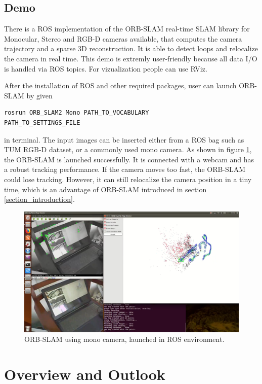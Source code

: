 \documentclass[letterpaper, 10 pt, conference]{ieeeconf}  %
\begin{document}
\subsection{Demo}
There is a ROS implementation of the ORB-SLAM real-time SLAM library for Monocular, Stereo and RGB-D cameras available, that computes the camera trajectory and a sparse 3D reconstruction. It is able to detect loops and relocalize the camera in real time. This demo is extremly user-friendly because all data I/O is handled via ROS topics. For vizualization people can use RViz. 

After the installation of ROS and other required packages, user can launch ORB-SLAM by given
%
\begin{lstlisting}
rosrun ORB_SLAM2 Mono PATH_TO_VOCABULARY 
PATH_TO_SETTINGS_FILE
\end{lstlisting}
%
in terminal. The input images can be inserted either from a ROS bag such as TUM RGB-D dataset, or a commonly used mono camera. As shown in figure \ref{example}, the ORB-SLAM is launched successfully. It is connected with a webcam and has a robust tracking performance. If the camera moves too fast, the ORB-SLAM could lose tracking. However, it can still relocalize the camera position in a tiny time, which is an advantage of ORB-SLAM introduced in section \ref{section_introduction}.


\begin{figure}[!htbp]
\centering
\includegraphics[scale=0.128]{./images/ORB_example}
\caption{ORB-SLAM using mono camera, launched in ROS environment.}
\label{example}
\end{figure}

\section{Overview and Outlook}
\end{document}
